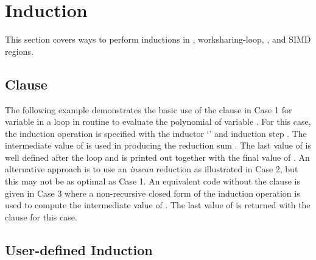 
\section{Induction}
\label{sec:induction}

This section covers ways to perform inductions in , worksharing-loop, , and SIMD regions.

\subsection{ Clause}
\label{subsec:induction}

The following example demonstrates the basic use of the  clause
in Case 1 for variable  in a loop in routine  to 
evaluate the polynomial of variable .  
For this case, the induction operation is specified
with the inductor `\scode{*}' and induction step .
The intermediate value of  is used in producing
the reduction sum .
The last value of  is well defined after the loop and 
is printed out together with the final value of .
An alternative approach is to use an \emph{inscan} reduction
as illustrated in Case 2, but this may not be as optimal as Case 1.
An equivalent code without the  clause is given in Case 3
where a non-recursive closed form of the induction operation is used to 
compute the intermediate value of . 
The last value of  is returned with the  clause
for this case.



\subsection{User-defined Induction}
\label{subsec:user-defined-induction}


